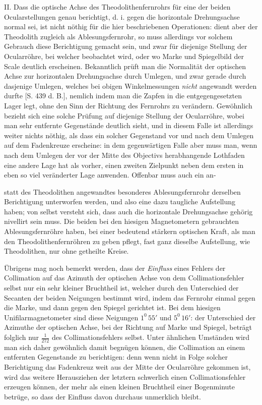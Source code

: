 II. Dass die optische Achse des Theodolithenfernrohrs für eine der beiden Ocularstellungen genau berichtigt, d. i. gegen die horizontale Drehungsachse normal sei, ist nicht nöthig für die hier beschriebenen Operationen: dient aber der Theodolith zugleich als Ablesungsfernrohr, so muss allerdings vor solchem Gebrauch diese Berichtigung gemacht sein, und zwar für diejenige Stellung der Ocularröhre, bei welcher beobachtet wird, oder wo Marke und Spiegelbild der Scale deutlich erscheinen. Bekanntlich prüft man die Normalität der optischen Achse zur horizontalen Drehungsachse durch Umlegen, und zwar gerade durch dasjenige Umlegen, welches bei obigen Winkelmessungen \textit{nicht} angewandt werden durfte [S. 439 d. B.], nemlich indem man die Zapfen in die entgegengesetzten Lager legt, ohne den Sinn der Richtung des Fernrohrs zu verändern. Gewöhnlich bezieht sich eine solche Prüfung auf diejenige Stellung der Ocularröhre, wobei man sehr entfernte Gegenstände deutlich sieht, und in diesem Falle ist allerdings weiter nichts nöthig, als dass ein solcher Gegenstand vor und nach dem Umlegen auf dem Fadenkreuze erscheine: in dem gegenwärtigen Falle aber muss man, wenn nach dem Umlegen der vor der Mitte des Objectivs herabhangende Lothfaden eine andere Lage hat als vorher, einen zweiten Zielpunkt neben dem ersten in eben so viel veränderter Lage anwenden. Offenbar muss auch ein an-
\par\clearpage
{}
\noindent statt des Theodolithen angewandtes besonderes Ablesungsfernrohr derselben Berichtigung unterworfen werden, und also eine dazu taugliche Aufstellung haben; von selbst versteht sich, dass auch die horizontale Drehungsachse gehörig nivellirt sein muss. Die beiden bei den hiesigen Magnetometern gebrauchten Ablesungsfernröhre haben, bei einer bedeutend stärkern optischen Kraft, als man den Theodolithenfernröhren zu geben pflegt, fast ganz dieselbe Aufstellung, wie Theodolithen, nur ohne getheilte Kreise.

Übrigens mag noch bemerkt werden, dass der \textit{Einfluss} eines Fehlers der Collimation auf das Azimuth der optischen Achse von dem Collimationsfehler selbst nur ein sehr kleiner Bruchtheil ist, welcher durch den Unterschied der Secanten der beiden Neigungen bestimmt wird, indem das Fernrohr einmal gegen die Marke, und dann gegen den Spiegel gerichtet ist. Bei dem hiesigen Unifilarmagnetometer sind diese Neigungen $1^0\,55'$ und $5^0\,16'$: der Unterschied der Azimuthe der optischen Achse, bei der Richtung auf Marke und Spiegel, beträgt folglich nur $\frac{1}{272}$ des Collimationsfehlers selbst. Unter ähnlichen Umständen wird man sich daher gewöhnlich damit begnügen können, die Collimation an einem entfernten Gegenstande zu berichtigen: denn wenn nicht in Folge solcher Berichtigung das Fadenkreuz weit aus der Mitte der Ocularröhre gekommen ist, wird das weitere Herausziehen der letztern schwerlich einen Collimationsfehler erzeugen können, der mehr als einen kleinen Bruchtheil einer Bogenminute betrüge, so dass der Einfluss davon durchaus unmerklich bleibt.

